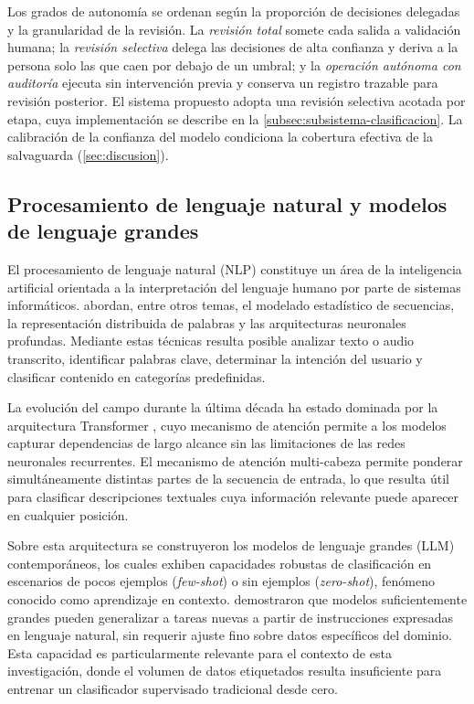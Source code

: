 Los grados de autonomía se ordenan según la proporción de decisiones delegadas y la granularidad de la revisión. La \emph{revisión total} somete cada salida a validación humana; la \emph{revisión selectiva} delega las decisiones de alta confianza y deriva a la persona solo las que caen por debajo de un umbral; y la \emph{operación autónoma con auditoría} ejecuta sin intervención previa y conserva un registro trazable para revisión posterior. El sistema propuesto adopta una revisión selectiva acotada por etapa, cuya implementación se describe en la \autoref{subsec:subsistema-clasificacion}. La calibración de la confianza del modelo condiciona la cobertura efectiva de la salvaguarda (\autoref{sec:discusion}).

\subsection{Procesamiento de lenguaje natural y modelos de lenguaje grandes}\label{subsec:nlp-llm}

El procesamiento de lenguaje natural (NLP) constituye un área de la inteligencia artificial orientada a la interpretación del lenguaje humano por parte de sistemas informáticos. \textcite{Jurafsky2026_speech_language} abordan, entre otros temas, el modelado estadístico de secuencias, la representación distribuida de palabras y las arquitecturas neuronales profundas. Mediante estas técnicas resulta posible analizar texto o audio transcrito, identificar palabras clave, determinar la intención del usuario y clasificar contenido en categorías predefinidas.

La evolución del campo durante la última década ha estado dominada por la arquitectura Transformer \parencite{Vaswani2017_attention}, cuyo mecanismo de atención permite a los modelos capturar dependencias de largo alcance sin las limitaciones de las redes neuronales recurrentes. El mecanismo de atención multi-cabeza permite ponderar simultáneamente distintas partes de la secuencia de entrada, lo que resulta útil para clasificar descripciones textuales cuya información relevante puede aparecer en cualquier posición.

Sobre esta arquitectura se construyeron los modelos de lenguaje grandes (LLM) contemporáneos, los cuales exhiben capacidades robustas de clasificación en escenarios de pocos ejemplos (\emph{few-shot}) o sin ejemplos (\emph{zero-shot}), fenómeno conocido como aprendizaje en contexto. \textcite{Brown2020_few_shot} demostraron que modelos suficientemente grandes pueden generalizar a tareas nuevas a partir de instrucciones expresadas en lenguaje natural, sin requerir ajuste fino sobre datos específicos del dominio. Esta capacidad es particularmente relevante para el contexto de esta investigación, donde el volumen de datos etiquetados resulta insuficiente para entrenar un clasificador supervisado tradicional desde cero.

